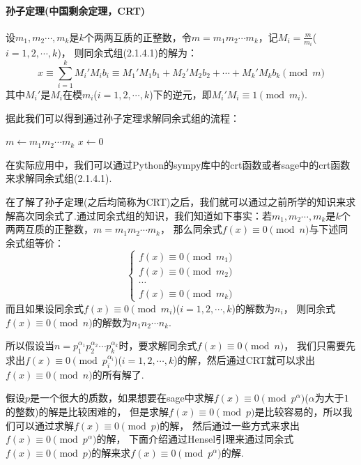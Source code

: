 \documentclass{book}
\numberwithin{equation}{subsubsection}
\begin{document}
\paragraph{孙子定理(中国剩余定理，CRT)}
设$m_1,m_2\cdots,m_k$是$k$个两两互质的正整数，令$m=m_1m_2\cdots m_k$，记$M_i=\frac{m}{m_i}$($i=1,2,\cdots,k$)，
则同余式组(2.1.4.1)的解为：
\begin{equation}
    x\equiv \sum_{i=1}^{k}M_i'M_ib_i\equiv M_1'M_1b_1+M_2'M_2b_2+\cdots+M_k'M_kb_k\pmod{m}
    \nonumber
\end{equation}
其中$M_i'$是$M_i$在模$m_i$($i=1,2,\cdots,k$)下的逆元，即$M_i'M_i\equiv 1\pmod{m_i}$.\par
据此我们可以得到通过孙子定理求解同余式组的流程：
\begin{algorithm}
    \caption{$\text{CRT}(b_1,b_2,\cdots,b_k;m_1,m_2,\cdots,m_k)$}
    $m\leftarrow m_1m_2\cdots m_k$
    $x\leftarrow 0$\\
\end{algorithm}\par
在实际应用中，我们可以通过Python的sympy库中的crt函数或者sage中的crt函数来求解同余式组(2.1.4.1).\par
在了解了孙子定理(之后均简称为CRT)之后，我们就可以通过之前所学的知识来求解高次同余式了.通过同余式组的知识，我们知道如下事实：若$m_1,m_2\cdots,m_k$是$k$个两两互质的正整数，$m= m_1m_2\cdots m_k$，
那么同余式$f(x)\equiv 0\pmod{n}$与下述同余式组等价：
\begin{equation}
    \begin{cases}
        f(x)\equiv 0\pmod{m_1}\\
        f(x)\equiv 0\pmod{m_2}\\
        \cdots\\
        f(x)\equiv 0\pmod{m_k}
    \end{cases}
    \nonumber
\end{equation}
而且如果设同余式$f(x)\equiv 0\pmod{m_i}$($i=1,2,\cdots,k$)的解数为$n_i$，
则同余式$f(x)\equiv 0\pmod{n}$的解数为$n_1n_2\cdots n_k$.\par
所以假设当$n=p_1^{\alpha_1}p_2^{\alpha_2}\cdots p_k^{\alpha_k}$时，要求解同余式$f(x)\equiv 0\pmod{n}$，
我们只需要先求出$f(x)\equiv 0\pmod{p_i^{\alpha_i}}$($i=1,2,\cdots,k$)的解，然后通过CRT就可以求出$f(x)\equiv 0\pmod{n}$的所有解了.\par
假设$p$是一个很大的质数，如果想要在sage中求解$f(x)\equiv 0\pmod{p^\alpha}$($\alpha$为大于$1$的整数)的解是比较困难的，
但是求解$f(x)\equiv 0\pmod{p}$是比较容易的，所以我们可以通过求解$f(x)\equiv 0\pmod{p}$的解，
然后通过一些方式来求出$f(x)\equiv 0\pmod{p^\alpha}$的解，
下面介绍通过Hensel引理来通过同余式$f(x)\equiv 0\pmod{p}$的解来求$f(x)\equiv 0\pmod{p^\alpha}$的解.\par
\end{document}
